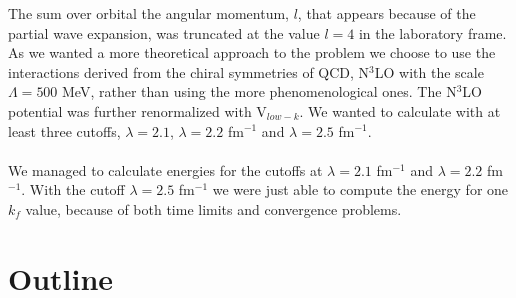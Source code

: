 The sum over orbital the angular momentum, $l$, that appears because of
the partial wave expansion, was truncated at the value $l=4$ in the laboratory frame.%
\\
As we wanted a more
theoretical approach to the problem we choose to use the interactions derived
from the chiral symmetries of QCD, N$^3$LO with the scale $\Lambda=500$ MeV, 
rather than using the more
phenomenological ones. The N$^3$LO potential was further renormalized with 
V$_{low-k}$. We wanted to calculate with at least three cutoffs, $\lambda=2.1$, $\lambda=2.2$ fm$^{-1}$ and $\lambda=2.5$ fm$^{-1}$.\\
\\
We managed to calculate energies for the cutoffs at $\lambda=2.1$ fm$^{-1}$ and $\lambda=2.2$ fm$^{-1}$. With the cutoff $\lambda=2.5$ fm$^{-1}$ we were just able to compute the energy for one $k_f$ value, because of both time limits and convergence problems.
\section*{Outline}

